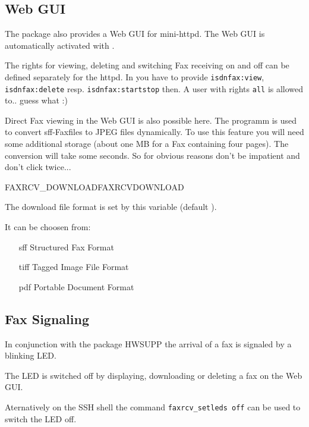 \subsection {Web GUI}

    The package also provides a Web GUI for mini-httpd.
    The Web GUI is automatically activated with .
    
    The rights for viewing, deleting and switching Fax receiving on and off can be defined
    separately for the httpd. In  you have to provide \verb?isdnfax:view?,
    \verb?isdnfax:delete? resp. \verb?isdnfax:startstop? then. A user with rights \verb?all?
    is allowed to.. guess what :)
    

    Direct Fax viewing in the Web GUI is also possible here. 
    The programm  is used to convert sff-Faxfiles to JPEG files
    dynamically.
    To use this feature you will need some additional storage (about one MB for
    a Fax containing four pages). The conversion will take some seconds. So for
    obvious reasons don't be impatient and don't click twice...
    

\begin{description}

     {FAXRCV\_DOWNLOAD}{FAXRCVDOWNLOAD}

    The download file format is set by this variable (default ). 
   
    It can be choosen from:
    \begin{itemize}
        \item[sff] Structured Fax Format
        \item[tiff] Tagged Image File Format
        \item[pdf] Portable Document Format
    \end{itemize}

\end{description}

\subsection {Fax Signaling}

    In conjunction with the package HWSUPP the arrival of a fax is signaled by 
    a blinking LED.
    
    The LED is switched off by displaying, downloading or deleting a fax on 
    the Web GUI.
    
    Aternatively on the SSH shell the command \texttt{faxrcv\_setleds off} 
    can be used to switch the LED off.

